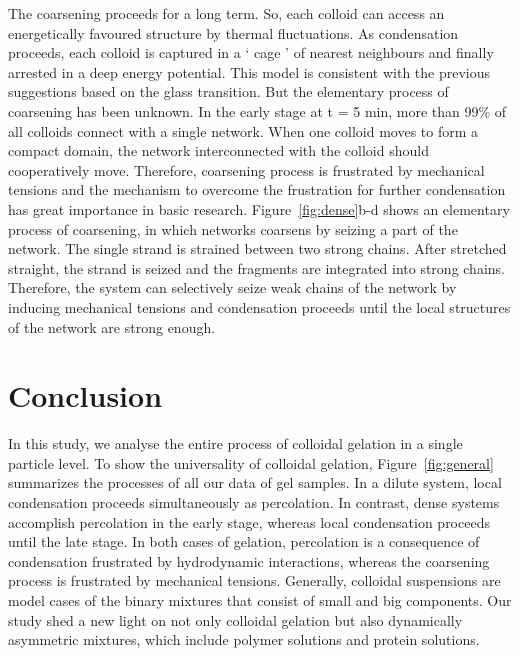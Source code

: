 The coarsening proceeds for a long term.
So, each colloid can access an energetically favoured structure by thermal fluctuations.
As condensation proceeds, each colloid is captured in a ‘ cage ’ of nearest neighbours and finally arrested in a deep energy potential.
This model is consistent with the previous suggestions based on the glass transition.
But the elementary process of coarsening has been unknown.
In the early stage at t = 5 min, more than 99\% of all colloids connect with a single network.
When one colloid moves to form a compact domain, the network interconnected with the colloid should cooperatively move.
Therefore, coarsening process is frustrated by mechanical tensions and the mechanism to overcome the frustration for further condensation has great importance in basic research.
Figure~\ref{fig:dense}b-d shows an elementary process of coarsening, in which networks coarsens by seizing a part of the network.
The single strand is strained between two strong chains.
After stretched straight, the strand is seized and the fragments are integrated into strong chains.
Therefore, the system can selectively seize weak chains of the network by inducing mechanical tensions and condensation proceeds until the local structures of the network are strong enough.




\section{Conclusion} %
In this study, we analyse the entire process of colloidal gelation in a single particle level.
To show the universality of colloidal gelation, Figure~\ref{fig:general} summarizes the processes of all our data of gel samples.
In a dilute system, local condensation proceeds simultaneously as percolation.
In contrast, dense systems accomplish percolation in the early stage, whereas local condensation proceeds until the late stage.
In both cases of gelation, percolation is a consequence of condensation frustrated by hydrodynamic interactions, whereas the coarsening process is frustrated by mechanical tensions.
Generally, colloidal suspensions are model cases of the binary mixtures that consist of small and big components.
Our study shed a new light on not only colloidal gelation but also dynamically asymmetric mixtures, which include polymer solutions and protein solutions. 




